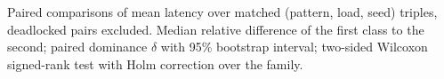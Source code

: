 \begin{table}[tbp]
\centering
\caption{Paired comparisons of mean latency over matched (pattern, load, seed) triples, deadlocked pairs excluded. Median relative difference of the first class to the second; paired dominance $\delta$ with 95\% bootstrap interval; two-sided Wilcoxon signed-rank test with Holm correction over the family.}
\label{tab:stats}
\small

\end{table}
